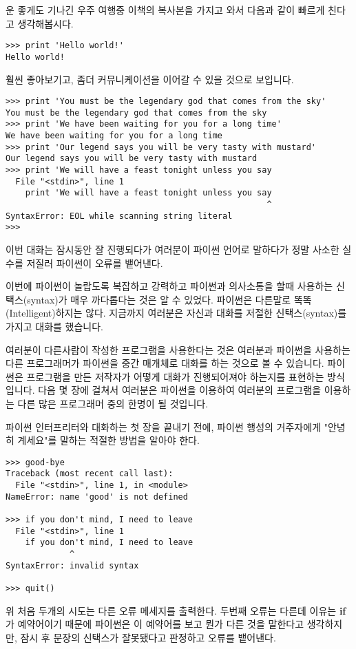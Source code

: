 운 좋게도 기나긴 우주 여행중 이책의 복사본을 가지고 와서 다음과 같이 빠르게 친다고 생각해봅시다.

\beforeverb
\begin{verbatim}
>>> print 'Hello world!'
Hello world!
\end{verbatim}
\afterverb
%

훨씬 좋아보기고, 좀더 커뮤니케이션을 이어갈 수 있을 것으로 보입니다.

\beforeverb
\begin{verbatim}
>>> print 'You must be the legendary god that comes from the sky'
You must be the legendary god that comes from the sky
>>> print 'We have been waiting for you for a long time'
We have been waiting for you for a long time
>>> print 'Our legend says you will be very tasty with mustard'
Our legend says you will be very tasty with mustard
>>> print 'We will have a feast tonight unless you say
  File "<stdin>", line 1
    print 'We will have a feast tonight unless you say
                                                     ^
SyntaxError: EOL while scanning string literal
>>> 
\end{verbatim}
\afterverb
%

이번 대화는 잠시동안 잘 진행되다가 여러분이 파이썬 언어로 말하다가 정말 사소한 실수를 저질러 파이썬이 오류를 뱉어낸다.

이번에 파이썬이 놀랍도록 복잡하고 강력하고 파이썬과 의사소통을 할때 사용하는 신택스(syntax)가 매우 까다롭다는 것은 알 수 있었다. 파이썬은 다른말로 똑똑(Intelligent)하지는 않다. 지금까지 여러분은 자신과 대화를 저절한 신택스(syntax)를 가지고 대화를 했습니다.

여러분이 다른사람이 작성한 프로그램을 사용한다는 것은 여러분과 파이썬을 사용하는 다른 프로그래머가 파이썬을 중간 매개체로 대화를 하는 것으로 볼 수 있습니다. 파이썬은 프로그램을 만든 저작자가 어떻게 대화가 진행되어져야 하는지를 표현하는 방식입니다. 다음 몇 장에 걸쳐서 여러분은 파이썬을 이용하여 여러분의 프로그램을 이용하는 다른 많은 프로그래머 중의 한명이 될 것입니다.

파이썬 인터프리터와 대화하는 첫 장을 끝내기 전에, 파이썬 행성의 거주자에게 "안녕히 계세요"를 말하는 적절한 방법을 알아야 한다.

\beforeverb
\begin{verbatim}
>>> good-bye
Traceback (most recent call last):
  File "<stdin>", line 1, in <module>
NameError: name 'good' is not defined

>>> if you don't mind, I need to leave
  File "<stdin>", line 1
    if you don't mind, I need to leave
             ^
SyntaxError: invalid syntax

>>> quit()
\end{verbatim}
\afterverb
%
위 처음 두개의 시도는 다른 오류 메세지를 출력한다. 두번째 오류는 다른데 이유는 {\bf if}가 예약어이기 때문에 파이썬은 이 예약어를 보고 뭔가 다른 것을 말한다고 생각하지만, 잠시 후 문장의 신택스가 잘못됐다고 판정하고 오류를 뱉어낸다.

